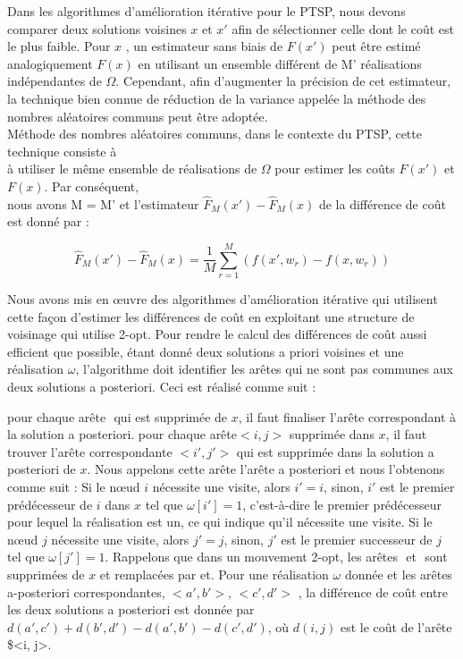 \documentclass[]{article}
\begin{document}
Dans les algorithmes d'amélioration itérative pour le PTSP, nous devons
comparer deux solutions voisines \(x\) et \(x'\) afin de sélectionner
celle dont le coût est le plus faible. Pour \(x\) , un estimateur sans
biais de \(F (x' )\) peut être estimé analogiquement \( F (x)\) en
utilisant un ensemble diﬀérent de M' réalisations indépendantes de
\(\Omega\). Cependant, afin d'augmenter la précision de cet estimateur,
la technique bien connue de réduction de la variance appelée la méthode
des nombres aléatoires communs peut être adoptée.\\
Méthode des nombres aléatoires communs, dans le contexte du PTSP, cette
technique consiste à\\
à utiliser le même ensemble de réalisations de \(\Omega\) pour estimer
les coûts \(F (x')\) et \(F (x)\). Par conséquent,\\
nous avons M = M' et l'estimateur \(\hat{F}_M (x') - \hat{F}_M (x)\) de
la diﬀérence de coût est donné par :

\[\hat{F}_M (x') - \hat{F}_M (x) = \frac{1}{M}\sum_{r=1}^M(f(x',w_r)-f(x,w_r))\]

Nous avons mis en œuvre des algorithmes d'amélioration itérative qui
utilisent cette façon d'estimer les diﬀérences de coût en exploitant une
structure de voisinage qui utilise 2-opt. Pour rendre le calcul des
diﬀérences de coût aussi eﬃcient que possible, étant donné deux
solutions a priori voisines et une réalisation \(\omega\), l'algorithme
doit identifier les arêtes qui ne sont pas communes aux deux solutions a
posteriori. Ceci est réalisé comme suit :

pour chaque arête \(<i, j >\) qui est supprimée de \(x\), il faut
ﬁnaliser l'arête correspondant à la solution a posteriori. pour chaque
arête\( <i, j>\) supprimée dans \(x\), il faut trouver l'arête
correspondante \(<i' , j'>\) qui est supprimée dans la solution a
posteriori de \(x\). Nous appelons cette arête l'arête a posteriori et
nous l'obtenons comme suit : Si le nœud \(i\) nécessite une visite,
alors \(i ' =i \), sinon, \(i'\) est le premier prédécesseur de \(i \)
dans \(x \) tel que \(\omega[i']= 1\), c'est-à-dire le premier
prédécesseur pour lequel la réalisation est un, ce qui indique qu'il
nécessite une visite. Si le nœud \(j\) nécessite une visite, alors
\(j' = j\), sinon, \(j'\) est le premier successeur de \(j\) tel que
\(\omega [j'] = 1\). Rappelons que dans un mouvement 2-opt, les arêtes
\(<a, b>\) et \(<c, d>\) sont supprimées de \(x \) et remplacées par
\(<a, c>\)et\(< b, d>\). Pour une réalisation \(\omega\) donnée et les
arêtes a-posteriori correspondantes, \(<a' , b'> \), \(<c' , d'>\) , la
diﬀérence de coût entre les deux solutions a posteriori est donnée par
\(d(a' ,c' ) + d( b' ,d' ) - d( a' ,b ' ) - d( c' ,d' ) \), où
\(d (i,j)\) est le coût de l'arête \$\textless{}i, j\textgreater{}.
\end{document}
